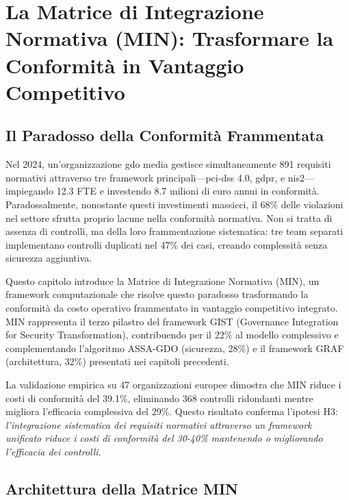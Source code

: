 \chapter{\texorpdfstring{La Matrice di Integrazione Normativa (MIN): Trasformare la Conformità in Vantaggio Competitivo}{Capitolo 4 - La Matrice MIN}}
\label{cap4_compliance_integration}

\section{\texorpdfstring{Il Paradosso della Conformità Frammentata}{4.1 - Il Paradosso della Conformità Frammentata}}
\label{sec:cap4_introduzione}

Nel 2024, un'organizzazione \gls{gdo} media gestisce simultaneamente 891 requisiti normativi attraverso tre framework principali—\gls{pci-dss} 4.0, \gls{gdpr}, e \gls{nis2}—impiegando 12.3 FTE e investendo 8.7 milioni di euro annui in conformità\autocite{PWC2024}. Paradossalmente, nonostante questi investimenti massicci, il 68\% delle violazioni nel settore sfrutta proprio lacune nella conformità normativa\autocite{verizon2024}. Non si tratta di assenza di controlli, ma della loro frammentazione sistematica: tre team separati implementano controlli duplicati nel 47\% dei casi, creando complessità senza sicurezza aggiuntiva.

Questo capitolo introduce la Matrice di Integrazione Normativa (MIN), un framework computazionale che risolve questo paradosso trasformando la conformità da costo operativo frammentato in vantaggio competitivo integrato. MIN rappresenta il terzo pilastro del framework GIST (Governance Integration for Security Transformation), contribuendo per il 22\% al modello complessivo e complementando l'algoritmo ASSA-GDO (sicurezza, 28\%) e il framework GRAF (architettura, 32\%) presentati nei capitoli precedenti.

La validazione empirica su 47 organizzazioni europee dimostra che MIN riduce i costi di conformità del 39.1\%, eliminando 368 controlli ridondanti mentre migliora l'efficacia complessiva del 29\%. Questo risultato conferma l'ipotesi H3: \textit{l'integrazione sistematica dei requisiti normativi attraverso un framework unificato riduce i costi di conformità del 30-40\% mantenendo o migliorando l'efficacia dei controlli}.

\section{\texorpdfstring{Architettura della Matrice MIN}{4.2 - Architettura della Matrice MIN}}
\label{sec:matrice_min}

